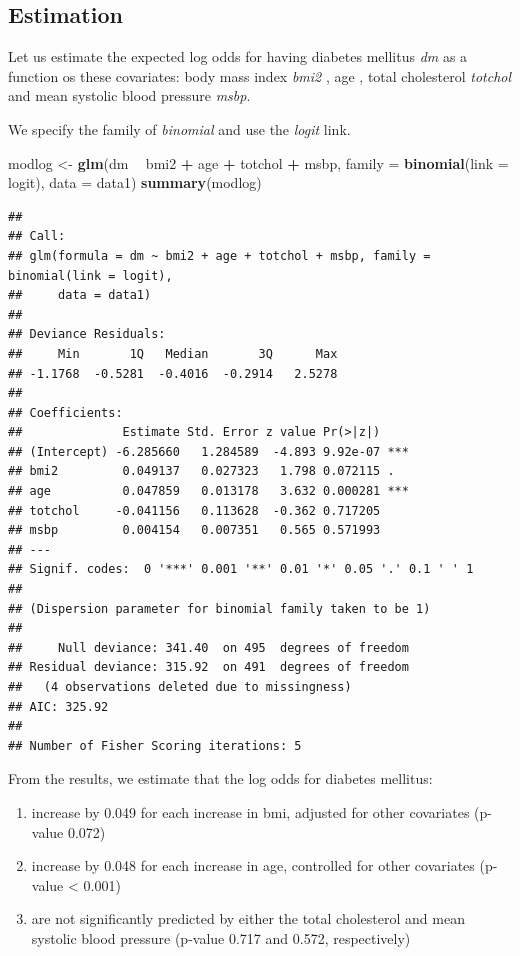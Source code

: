 \documentclass[]{book}
\newenvironment{Shaded}{\begin{snugshade}}{\end{snugshade}}
\newcommand{\KeywordTok}[1]{\textcolor[rgb]{0.13,0.29,0.53}{\textbf{#1}}}
\newcommand{\DataTypeTok}[1]{\textcolor[rgb]{0.13,0.29,0.53}{#1}}
\newcommand{\StringTok}[1]{\textcolor[rgb]{0.31,0.60,0.02}{#1}}
\newcommand{\OperatorTok}[1]{\textcolor[rgb]{0.81,0.36,0.00}{\textbf{#1}}}
\newcommand{\NormalTok}[1]{#1}
\providecommand{\tightlist}{%
  \setlength{\itemsep}{0pt}\setlength{\parskip}{0pt}}
\theoremstyle{definition}
\theoremstyle{definition}
\theoremstyle{remark}
\begin{document}
\subsection{Estimation}\label{estimation-1}

Let us estimate the expected log odds for having diabetes mellitus
\emph{dm} as a function os these covariates: body mass index \emph{bmi2}
, age , total cholesterol \emph{totchol }and mean systolic blood
pressure \emph{msbp}.

We specify the family of \emph{binomial} and use the \emph{logit} link.

\begin{Shaded}
\begin{Highlighting}[]
\NormalTok{modlog <-}\StringTok{ }\KeywordTok{glm}\NormalTok{(dm }\OperatorTok{~}\StringTok{ }\NormalTok{bmi2 }\OperatorTok{+}\StringTok{ }\NormalTok{age }\OperatorTok{+}\StringTok{ }\NormalTok{totchol }\OperatorTok{+}\StringTok{ }\NormalTok{msbp, }\DataTypeTok{family =} \KeywordTok{binomial}\NormalTok{(}\DataTypeTok{link =}\NormalTok{ logit), }\DataTypeTok{data =}\NormalTok{ data1)}
\KeywordTok{summary}\NormalTok{(modlog)}
\end{Highlighting}
\end{Shaded}

\begin{verbatim}
## 
## Call:
## glm(formula = dm ~ bmi2 + age + totchol + msbp, family = binomial(link = logit), 
##     data = data1)
## 
## Deviance Residuals: 
##     Min       1Q   Median       3Q      Max  
## -1.1768  -0.5281  -0.4016  -0.2914   2.5278  
## 
## Coefficients:
##              Estimate Std. Error z value Pr(>|z|)    
## (Intercept) -6.285660   1.284589  -4.893 9.92e-07 ***
## bmi2         0.049137   0.027323   1.798 0.072115 .  
## age          0.047859   0.013178   3.632 0.000281 ***
## totchol     -0.041156   0.113628  -0.362 0.717205    
## msbp         0.004154   0.007351   0.565 0.571993    
## ---
## Signif. codes:  0 '***' 0.001 '**' 0.01 '*' 0.05 '.' 0.1 ' ' 1
## 
## (Dispersion parameter for binomial family taken to be 1)
## 
##     Null deviance: 341.40  on 495  degrees of freedom
## Residual deviance: 315.92  on 491  degrees of freedom
##   (4 observations deleted due to missingness)
## AIC: 325.92
## 
## Number of Fisher Scoring iterations: 5
\end{verbatim}

From the results, we estimate that the log odds for diabetes mellitus:

\begin{enumerate}
\def\labelenumi{\arabic{enumi}.}
\tightlist
\item
  increase by 0.049 for each increase in bmi, adjusted for other
  covariates (p-value 0.072)
\item
  increase by 0.048 for each increase in age, controlled for other
  covariates (p-value \textless{} 0.001)
\item
  are not significantly predicted by either the total cholesterol and
  mean systolic blood pressure (p-value 0.717 and 0.572, respectively)
\end{enumerate}
\end{document}
